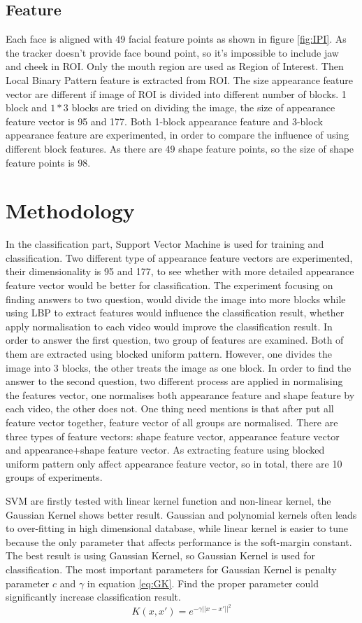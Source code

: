 \subsection{Feature}
Each face is aligned with 49 facial feature points as shown in figure \ref{fig:IPI}. As the tracker doesn't provide face bound point, so it's impossible to include jaw and cheek in ROI. Only the mouth region are used as Region of Interest. Then Local Binary Pattern feature is extracted from ROI. The size appearance feature vector are different if image of ROI is divided into different number of blocks. 1 block and $1*3$ blocks are tried on dividing the image, the size of appearance feature vector is 95 and 177. Both 1-block appearance feature and 3-block appearance feature are experimented, in order to compare the influence of using different block features. As there are 49 shape feature points, so the size of shape feature points is 98.

\section{Methodology}
In the classification part, Support Vector Machine is used for training and classification. Two different type of appearance feature vectors are experimented, their dimensionality is 95 and 177, to see whether with more detailed appearance feature vector would be better for classification. The experiment focusing on finding answers to two question, would divide the image into more blocks while using LBP to extract features would influence the classification result, whether apply normalisation to each video would improve the classification result. In order to answer the first question, two group of features are examined. Both of them are extracted using blocked uniform pattern. However, one divides the image into 3 blocks, the other treats the image as one block. In order to find the answer to the second question, two different process are applied in normalising the features vector, one normalises both appearance feature and shape feature by each video, the other does not. One thing need mentions is that after put all feature vector together, feature vector of all groups are normalised. There are three types of feature vectors: shape feature vector, appearance feature vector and appearance+shape feature vector. As extracting feature using blocked uniform pattern only affect appearance feature vector, so in total, there are 10 groups of experiments.

SVM are firstly tested with linear kernel function and non-linear kernel, the Gaussian Kernel shows better result. Gaussian and polynomial kernels often leads to over-fitting in high dimensional database, while linear kernel is easier to tune because the only parameter that affects performance is the soft-margin constant\cite{ben2010user}. The best result is using Gaussian Kernel, so Gaussian Kernel is used for classification. The most important parameters for Gaussian Kernel is  penalty parameter $c$ and $\gamma$ in equation \ref{eq:GK}. Find the proper parameter could significantly increase classification result.
\begin{equation}
K(x,x') = e^{-\gamma||x-x'||^{2}}
\label{eq:GK}
\end{equation}

